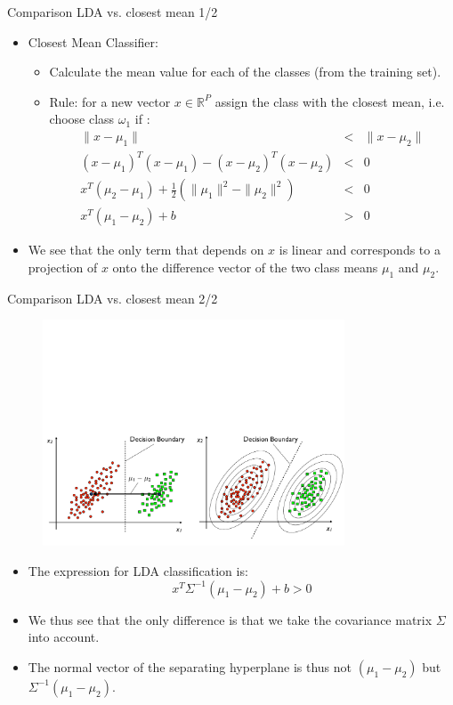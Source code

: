 \documentclass[xcolor=pdftex,dvipsnames,table]{beamer}
\begin{document}
\begin{frame}{Comparison LDA vs. closest mean 1/2}
\begin{itemize}
	\item Closest Mean Classifier:
	\begin{itemize}
		\item Calculate the mean value for each of the classes (from the training set).
		\item Rule: for a new vector $x \in \mathbb{R}^P$ assign the class with the closest mean, i.e. choose class $\omega_1$ if :
		\begin{eqnarray*}
		\|x - \mu_1\| &<& \|x - \mu_2\| \\
		(x-\mu_1)^T(x-\mu_1) - (x-\mu_2)^T(x-\mu_2) &<& 0 \\
		x^T(\mu_2 - \mu_1) + \frac{1}{2}(\|\mu_1\|^2 - \|\mu_2\|^2) &<& 0 \\
		x^T(\mu_1 - \mu_2) + b &>& 0
		\end{eqnarray*}
	\end{itemize}
	\item We see that the only term that depends on $x$ is linear and corresponds to a projection of $x$ onto the difference vector of the two class means $\mu_1$ and $\mu_2$.
\end{itemize}
\end{frame}

\begin{frame}{Comparison LDA vs. closest mean 2/2}
	\begin{figure}[htb]
		\includegraphics[width=0.8\textwidth]{../graphics/LDA_projection.pdf}
	\end{figure}
	\begin{itemize}
		\item The expression for LDA classification is:
		\begin{equation*}
			x^T\Sigma^{-1}(\mu_1-\mu_2) + b > 0
		\end{equation*}
		\item We thus see that the only difference is that we take the covariance matrix $\Sigma$ into account.
		\item The normal vector of the separating hyperplane is thus not $(\mu_1-\mu_2)$ but $\Sigma^{-1}(\mu_1-\mu_2)$.
	\end{itemize}
\end{frame}
\end{document}
